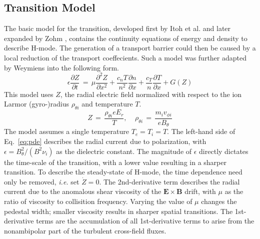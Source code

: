 \documentclass[a4paper]{article}
\begin{document}


\subsection{Transition Model}
The basic model for the transition, developed first by Itoh et al. \cite{itoh_edge_1991} and later expanded by Zohm \cite{zohm_dynamic_1994}, contains the continuity equations of energy and density to describe H-mode.
The generation of a transport barrier could then be caused by a local reduction of the transport coeffecients.
Such a model was further adapted by Weymiens \cite{weymiens_bifurcation_2014} into the following form.
\begin{equation}
	\epsilon \frac{\partial Z}{\partial t} \,=\, \mu \frac{\partial^2 Z}{\partial x^2} + \frac{c_n T}{n^2} \frac{\partial n}{\partial x} + \frac{c_T}{n} \frac{\partial T}{\partial x} + G(Z)
	\label{eq:pde}
\end{equation}
This model uses $Z$, the radial electric field normalized with respect to the ion Larmor (gyro-)radius $\rho_{\theta i}$ and temperature $T$.
\begin{equation}
	Z \,=\, \frac{\rho_{\theta i} e E_r}{T}, ~~~~~ \rho_{\theta i} \,=\, \frac{m_i v_{\phi i}}{e B_\theta}
	\label{eq:normalization}
\end{equation}
The model assumes a single temperature $T_e = T_i = T$.
The left-hand side of Eq.~\ref{eq:pde} describes the radial current due to polarization, with $\epsilon = B_\theta^2 / (B^2 \nu_i)$ as the dielectric constant.
The magnitude of $\epsilon$ directly dictates the time-scale of the transition, with a lower value resulting in a sharper transition.
To describe the steady-state of H-mode, the time dependence need only be removed, \emph{i.e.} set $\dot{Z} = 0$.
The 2nd-derivative term describes the radial current due to the anomalous shear viscosity of the $\mathbf{E}\times\mathbf{B}$ drift, with $\mu$ as the ratio of viscosity to collisition frequency.
Varying the value of $\mu$ changes the pedestal width; smaller viscosity results in sharper spatial transitions.
The 1st-derivative terms are the accumulation of all 1st-derivative terms to arise from the nonambipolar part of the turbulent cross-field fluxes.
\end{document}
